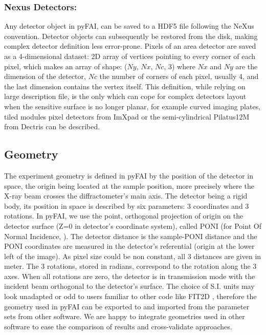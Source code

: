 \documentclass[preprint]{iucr}
\begin{document}
\subsubsection{Nexus Detectors:}
Any detector object in pyFAI, can be saved to a HDF5 file following the NeXus
\cite{nexus} convention.
Detector objects can subsequently be restored from the disk, making
complex detector definition less error-prone.
Pixels of an area detector are saved as a 4-dimensional dataset: 2D
array of vertices pointing to every corner of each pixel, which makes an array
of shape: ($Ny$, $Nx$, $Nc$, 3) where $Nx$ and $Ny$ are the dimension of the
detector, $Nc$ the number of corners of each pixel, usually 4, and the last
dimension contains the vertex itself.
This definition, while relying on large description file, is the only which
can cope for complex detectors layout when the sensitive surface is no
longer planar, for example curved imaging plates, tiled modules pixel detectors
from ImXpad or the semi-cylindrical Pilatus12M from Dectris can be described.

\subsection{Geometry}
The experiment geometry is defined in pyFAI by the position of the detector in
space, the origin being located at the sample position, more precisely where the
X-ray beam crosses the diffractometer's main axis.
The detector being a rigid body, its position in space is described by
six parameters: 3 coordinates and 3 rotations. 
In pyFAI, we use the point, orthogonal projection
of origin on the detector surface (Z=0 in detector's coordinate system), called
PONI (for Point Of Normal Incidence, \cite{spd}). 
The detector distance is the sample-PONI distance
and the PONI coordinates are measured in the detector's referential (origin at the lower
left of the image). As pixel size could be non constant, all 3 distances are
given in meter.
The 3 rotations, stored in radians, correspond to the rotation along the 3
axes.
When all rotations are zero, the detector is in transmission mode with the
incident beam orthogonal to the detector's surface.
The choice of S.I. units may look unadapted or odd to users familiar to
other code like FIT2D \cite{fit2d}, therefore the geometry used in pyFAI can be
exported to and imported from the parameter sets from other software.
We are happy to integrate geometries used in other software to ease the
comparison of results and cross-validate approaches.  
 
\end{document}
